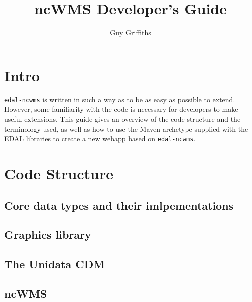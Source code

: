 \documentclass[a4paper]{article}
\title{ncWMS Developer's Guide}
\author{Guy Griffiths}
\begin{document}
\maketitle




\section{Intro}
{\tt edal-ncwms} is written in such a way as to be as easy as possible to
extend.  However, some familiarity with the code is necessary for developers to
make useful extensions.  This guide gives an overview of the code structure and
the terminology used, as well as how to use the Maven archetype supplied with
the EDAL libraries to create a new webapp based on {\tt edal-ncwms}.

\section{Code Structure}

\subsection{Core data types and their imlpementations}

\subsection{Graphics library}

\subsection{The Unidata CDM}

\subsection{ncWMS}

\subsection{}
\end{document}
